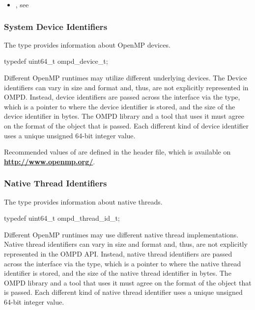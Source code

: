 \crossreferences
\begin{itemize}
\item {}, 
see 
\end{itemize}

\subsubsection{System Device Identifiers}
\label{ompd:omp_device_t}

\summary
The  type provides information about OpenMP devices.

\format
\begin{ccppspecific}
\begin{ompSyntax}
typedef uint64_t ompd_device_t;
\end{ompSyntax}
\end{ccppspecific}
\descr
Different OpenMP runtimes may utilize different underlying devices. The 
Device identifiers can vary in size and format and, thus, are not explicitly 
represented in OMPD. Instead, device identifiers are passed across the interface 
via the  type, which is a pointer to where the device 
identifier is stored, and the size of the device identifier in bytes. The 
OMPD library and a tool that uses it must agree on the format of the object 
that is passed. Each different kind of device identifier uses a unique 
unsigned 64-bit integer value.

Recommended values of  are defined in the 
header file, which is available on \textbf{\url{http://www.openmp.org/}}.



\subsubsection{Native Thread Identifiers}
\label{ompd:ompd_thread_id_t}

\summary
The  type provides information about native threads.

\format
\begin{ccppspecific}
\begin{ompSyntax}
typedef uint64_t ompd_thread_id_t;
\end{ompSyntax}
\end{ccppspecific}

\descr
Different OpenMP runtimes may use different native thread implementations.
Native thread identifiers can vary in size and format and, thus, are not 
explicitly represented in the OMPD API. Instead, native thread identifiers 
are passed across the interface via the  type, which 
is a pointer to where the native thread identifier is stored, and the size 
of the native thread identifier in bytes. The OMPD library and a tool that 
uses it must agree on the format of the object that is passed. Each different 
kind of native thread identifier uses a unique unsigned 64-bit integer value.

